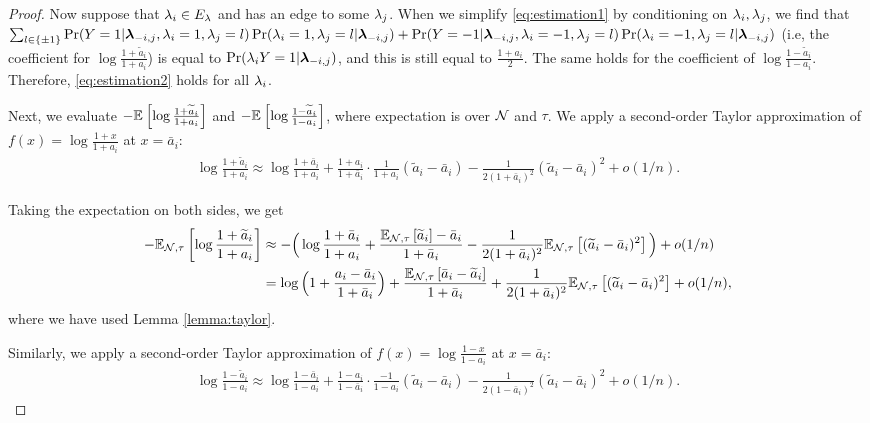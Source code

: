 \begin{proof}
Now suppose that $\lambda_i \in E_{\lambda}$ and has an edge to some $\lambda_j$. When we simplify \eqref{eq:estimation1} by conditioning on $\lambda_i, \lambda_j$, we find that $\sum_{l \in \{\pm 1\}}\Pr(Y = 1 | \bm{\lambda}_{-i, j}, \lambda_i = 1, \lambda_j = l) \Pr(\lambda_i = 1, \lambda_j = l | \bm{\lambda}_{-i, j}) + \Pr(Y = -1 | \bm{\lambda}_{-i, j}, \lambda_i = -1, \lambda_j = l) \Pr(\lambda_i = -1, \lambda_j = l | \bm{\lambda}_{-i, j} )$ (i.e, the coefficient for $\log \frac{1 + \widetilde{a}_i}{1 + a_i}$) is equal to $\Pr(\lambda_i Y = 1 | \bm{\lambda}_{-i, j})$, and this is still equal to $\frac{1 + a_i}{2}$. The same holds for the coefficient of $\log \frac{1 - \widetilde{a}_i}{1 - a_i}$. Therefore, \eqref{eq:estimation2} holds for all $\lambda_i$.

Next, we evaluate $-\mathbb{E}_{}\left[\log \frac{1 + \widetilde{a}_i}{1 + a_i}\right]$ and $-\mathbb{E}_{}\left[\log \frac{1 - \widetilde{a}_i}{1 - a_i}\right]$, where expectation is over $\mathcal{N}$ and $\tau$. We apply a second-order Taylor approximation of $f(x) = \log \frac{1 + x}{1 + a_i}$ at $x = \bar{a}_i$:
\begin{align*}
\log \frac{1 + \widetilde{a}_i}{1 + a_i} \approx \log \frac{1 + \bar{a}_i}{1 + a_i} + \frac{1 + a_i}{1 + \bar{a}_i} \cdot \frac{1}{1 + a_i} (\widetilde{a}_i - \bar{a}_i) - \frac{1}{2(1 + \bar{a}_i)^2} (\widetilde{a}_i - \bar{a}_i)^2 + o(1/n).
\end{align*}


Taking the expectation on both sides, we get 
\begin{align*}
-\mathbb{E}_{\mathcal{N}, \tau}\left[\log \frac{1 + \widetilde{a}_i}{1 + a_i}\right] &\approx -\Big(\log \frac{1 + \bar{a}_i}{1 + a_i} + \frac{\mathbb{E}_{\mathcal{N}, \tau}\left[\widetilde{a}_i\right] - \bar{a}_i}{1 + \bar{a}_i} - \frac{1}{2(1 + \bar{a}_i)^2} \mathbb{E}_{\mathcal{N}, \tau}\left[(\widetilde{a}_i - \bar{a}_i)^2\right]\Big) + o(1/n) \\
&= \log \Big(1 + \frac{a_i - \bar{a}_i}{1 + \bar{a}_i} \Big) + \frac{\mathbb{E}_{\mathcal{N}, \tau}\left[\bar{a}_i - \widetilde{a}_i\right]}{1 + \bar{a}_i} + \frac{1}{2(1 + \bar{a}_i)^2} \mathbb{E}_{\mathcal{N}, \tau}\left[(\widetilde{a}_i - \bar{a}_i)^2\right] + o(1/n),
\end{align*}
where we have used Lemma \ref{lemma:taylor}. 

Similarly, we apply a second-order Taylor approximation of $f(x) = \log \frac{1 - x}{1 - a_i}$ at $x = \bar{a}_i$:
\begin{align*}
\log \frac{1 - \widetilde{a}_i}{1 - a_i} \approx \log \frac{1 - \bar{a}_i}{1 - a_i} + \frac{1 - a_i}{1 - \bar{a}_i} \cdot \frac{-1}{1 - a_i} (\widetilde{a}_i - \bar{a}_i) - \frac{1}{2(1 - \bar{a}_i)^2} (\widetilde{a}_i - \bar{a}_i)^2 + o(1/n).
\end{align*}


\end{proof}
